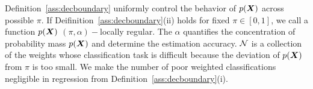 \documentclass[11pt]{article}
\theoremstyle{definition}
\newtheorem{assumption}{Assumption}
\def\bayesS{S_{\textup{bayes}}}
\begin{document}
Definition~\ref{ass:decboundary} uniformly control the behavior of $p(\bm X)$ across possible $\pi$. If Deifinition~\ref{ass:decboundary}(ii) holds for fixed $\pi\in[0,1]$, we call a function $p(\bm X)$ $(\pi,\alpha)-$locally regular.
The $\alpha$ quantifies the concentration of probability mass $p(\bm X)$ and determine the estimation accuracy. $\mathcal{N}$ is a collection of the weights whose classification task is difficult because the deviation of $p(\bm X)$ from $\pi$ is too small. We make the number of poor weighted classifications  negligible in regression from Definition~\ref{ass:decboundary}(i). 


\end{document}
